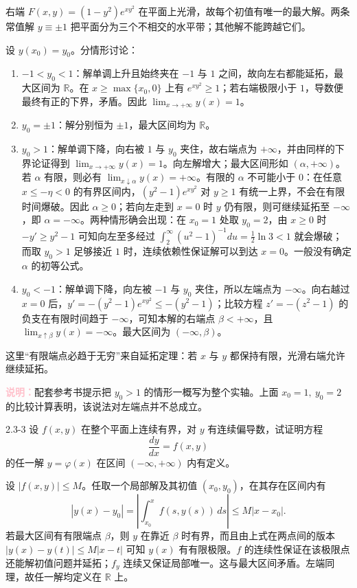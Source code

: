 \documentclass[UTF8,a4paper,11pt]{ctexart}
\newcommand{\note}[1]{\par\smallskip\noindent\textcolor{pink}{\bfseries 说明：}#1\par\smallskip}
\begin{document}
\begin{solution}
右端 $F(x,y)=(1-y^2)e^{xy^2}$ 在平面上光滑，故每个初值有唯一的最大解。两条常值解 $y\equiv\pm1$ 把平面分为三个不相交的水平带；其他解不能跨越它们。

设 $y(x_0)=y_0$。分情形讨论：
\begin{enumerate}[label=(\arabic*)]
\item $-1<y_0<1$：解单调上升且始终夹在 $-1$ 与 $1$ 之间，故向左右都能延拓，最大区间为 $\mathbb R$。在 $x\ge\max\{x_0,0\}$ 上有 $e^{xy^2}\ge1$；若右端极限小于 $1$，导数便最终有正的下界，矛盾。因此 $\lim_{x\to+\infty}y(x)=1$。
\item $y_0=\pm1$：解分别恒为 $\pm1$，最大区间均为 $\mathbb R$。
\item $y_0>1$：解单调下降，向右被 $1$ 与 $y_0$ 夹住，故右端点为 $+\infty$，并由同样的下界论证得到 $\lim_{x\to+\infty}y(x)=1$。向左解增大；最大区间形如 $(\alpha,+\infty)$。若 $\alpha$ 有限，则必有 $\lim_{x\downarrow\alpha}y(x)=+\infty$。有限的 $\alpha$ 不可能小于 $0$：在任意 $x\le-\eta<0$ 的有界区间内，$(y^2-1)e^{xy^2}$ 对 $y\ge1$ 有统一上界，不会在有限时间爆破。因此 $\alpha\ge0$；若向左走到 $x=0$ 时 $y$ 仍有限，则可继续延拓至 $-\infty$，即 $\alpha=-\infty$。两种情形确会出现：在 $x_0=1$ 处取 $y_0=2$，由 $x\ge0$ 时 $-y'\ge y^2-1$ 可知向左至多经过 $\int_2^{\infty}(u^2-1)^{-1}du=\tfrac12\ln3<1$ 就会爆破；而取 $y_0>1$ 足够接近 $1$ 时，连续依赖性保证解可以到达 $x=0$。一般没有确定 $\alpha$ 的初等公式。
\item $y_0<-1$：解单调下降，向左被 $-1$ 与 $y_0$ 夹住，所以左端点为 $-\infty$。向右越过 $x=0$ 后，$y'=-(y^2-1)e^{xy^2}\le-(y^2-1)$；比较方程 $z'=-(z^2-1)$ 的负支在有限时间趋于 $-\infty$，可知本解的右端点 $\beta<+\infty$，且 $\lim_{x\uparrow\beta}y(x)=-\infty$。最大区间为 $(-\infty,\beta)$。
\end{enumerate}
这里“有限端点必趋于无穷”来自延拓定理：若 $x$ 与 $y$ 都保持有限，光滑右端允许继续延拓。
\note{配套参考书提示把 $y_0>1$ 的情形一概写为整个实轴。上面 $x_0=1,\ y_0=2$ 的比较计算表明，该说法对左端点并不总成立。}
\end{solution}

\begin{problem}{2.3-3}
设 $f(x,y)$ 在整个平面上连续有界，对 $y$ 有连续偏导数，试证明方程
  \[
    \frac{dy}{dx}=f(x,y)
  \]
  的任一解 $y=\varphi(x)$ 在区间 $(-\infty,+\infty)$ 内有定义。
\end{problem}

\begin{solution}
设 $|f(x,y)|\le M$。任取一个局部解及其初值 $(x_0,y_0)$，在其存在区间内有
\[
|y(x)-y_0|=\left|\int_{x_0}^{x}f(s,y(s))\,ds\right|\le M|x-x_0|.
\]
若最大区间有有限端点 $\beta$，则 $y$ 在靠近 $\beta$ 时有界，而且由上式在两点间的版本 $|y(x)-y(t)|\le M|x-t|$ 可知 $y(x)$ 有有限极限。$f$ 的连续性保证在该极限点还能解初值问题并延拓；$f_y$ 连续又保证局部唯一。这与最大区间矛盾。左端同理，故任一解均定义在 $\boxed{\mathbb R}$ 上。
\end{solution}
\end{document}
